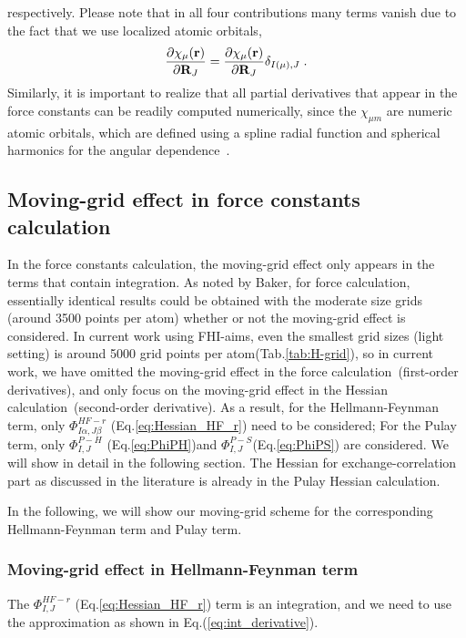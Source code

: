 \documentclass[journal=jpca,manuscript=article]{achemso}
\renewcommand{\vec}[1]{{\bf #1}}
\begin{document}
respectively.
Please note that in all four contributions many terms vanish due to the fact that 
we use localized atomic orbitals, 
\begin{equation}
\frac{\partial \chi_{\mu}(\vec{r})}{\partial \vec{R}_{J}} = 
\frac{\partial \chi_{\mu}(\vec{r})}{\partial \vec{R}_{J}} \delta_{I(\mu),J} \; .
\label{eq:basis_fixed}
\end{equation}
Similarly, it is important to
realize that all partial derivatives that appear in the force constants can be readily computed numerically, since the $\chi_{\mu m}$ are numeric atomic orbitals, which are defined using a spline radial function and spherical harmonics for the angular dependence~\cite{Blum2009}.



\subsection{Moving-grid effect in force constants calculation}
\label{sec:FC_moving}
In the force constants calculation, the moving-grid effect only appears in the terms that contain
integration. As noted by Baker\cite{Baker1994}, for force calculation,
essentially identical results could be obtained with the moderate size grids (around 3500 points per atom) whether or not the moving-grid effect is considered. In current work using FHI-aims, even the smallest grid sizes (light setting) is around 5000 grid points per atom(Tab.\ref{tab:H-grid}), so in current work, we have omitted the moving-grid effect in the force calculation~(first-order derivatives), and only focus on the moving-grid effect in the Hessian calculation~(second-order derivative). As a result, for the Hellmann-Feynman term, only $\Phi_{I\alpha,J\beta}^{HF-r}$ (Eq.\ref{eq:Hessian_HF_r}) need to be considered; For the Pulay term, only $\Phi_{I,J}^{P-H}$ (Eq.\ref{eq:PhiPH})and $\Phi_{I,J}^{P-S}$(Eq.\ref{eq:PhiPS}) are considered. We will show in detail in the following section. The Hessian for exchange-correlation part as discussed in the literature\cite{Johnson1993,Baker1994,Malagoli2003}  is already in the Pulay Hessian calculation. 

In the following, we will show our moving-grid scheme for the corresponding Hellmann-Feynman term and Pulay term. 

\subsubsection{Moving-grid effect in Hellmann-Feynman term } 
The $\Phi_{I,J}^{HF-r}$ (Eq.\ref{eq:Hessian_HF_r}) term is an integration, and we
need to use the approximation as shown in Eq.(\ref{eq:int_derivative}).
\end{document}
